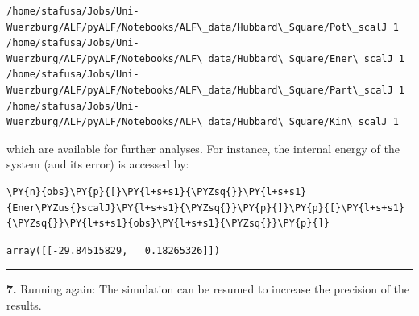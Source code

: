     \begin{Verbatim}[commandchars=\\\{\}]
/home/stafusa/Jobs/Uni-
Wuerzburg/ALF/pyALF/Notebooks/ALF\_data/Hubbard\_Square/Pot\_scalJ 1
/home/stafusa/Jobs/Uni-
Wuerzburg/ALF/pyALF/Notebooks/ALF\_data/Hubbard\_Square/Ener\_scalJ 1
/home/stafusa/Jobs/Uni-
Wuerzburg/ALF/pyALF/Notebooks/ALF\_data/Hubbard\_Square/Part\_scalJ 1
/home/stafusa/Jobs/Uni-
Wuerzburg/ALF/pyALF/Notebooks/ALF\_data/Hubbard\_Square/Kin\_scalJ 1
    \end{Verbatim}

    which are available for further analyses. For instance, the internal
energy of the system (and its error) is accessed by:

    \begin{tcolorbox}[breakable, size=fbox, boxrule=1pt, pad at break*=1mm,colback=cellbackground, colframe=cellborder]
\begin{Verbatim}[commandchars=\\\{\}]
\PY{n}{obs}\PY{p}{[}\PY{l+s+s1}{\PYZsq{}}\PY{l+s+s1}{Ener\PYZus{}scalJ}\PY{l+s+s1}{\PYZsq{}}\PY{p}{]}\PY{p}{[}\PY{l+s+s1}{\PYZsq{}}\PY{l+s+s1}{obs}\PY{l+s+s1}{\PYZsq{}}\PY{p}{]}
\end{Verbatim}
\end{tcolorbox}

            \begin{tcolorbox}[breakable, size=fbox, boxrule=.5pt, pad at break*=1mm, opacityfill=0]
\begin{Verbatim}[commandchars=\\\{\}]
array([[-29.84515829,   0.18265326]])
\end{Verbatim}
\end{tcolorbox}
        
    \begin{center}\rule{0.5\linewidth}{0.5pt}\end{center}

\textbf{7.} Running again: The simulation can be resumed to increase the
precision of the results.

